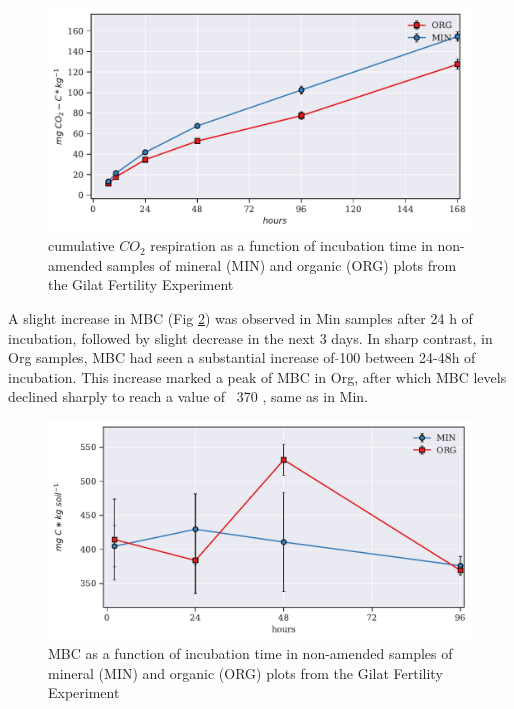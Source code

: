   			\begin{figure}[H]
  				\centering
  				\includegraphics[scale=0.8]{thesis_figures/preliminary/Cum_Resp_CON.pdf}
  				\caption{cumulative $CO_2$ respiration  as a function of incubation time in non-amended samples  of mineral (MIN) and organic (ORG) plots from the Gilat Fertility Experiment}
  				\label{fig:cum_resp_control_preliminary}
  			\end{figure}
            \noindent A slight increase in MBC (Fig \ref{fig:mbc_control_preliminary}) was observed in Min samples after 24 h of incubation, followed by slight decrease in the next 3 days.  In sharp contrast, in Org samples, MBC had seen a substantial increase of $ \tilde{} $100 \genericunit  between 24-48h of incubation. This increase marked a peak of MBC in Org, after which MBC levels declined sharply to reach a value of ~370 \genericunit, same as in Min.

        \begin{figure}[H]
            \centering
            \includegraphics[scale=0.8]{thesis_figures/preliminary/control/MBC.pdf}
            \caption{MBC  as a function of incubation time in non-amended samples  of mineral (MIN) and organic (ORG) plots from the Gilat Fertility Experiment}
            \label{fig:mbc_control_preliminary}
        \end{figure}

